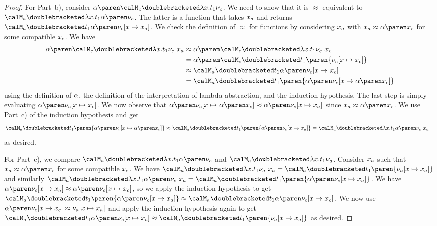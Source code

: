 \documentclass[../../diss.tex]{subfiles}
\begin{document}
\begin{proof}
    For Part~b), consider $\abs{\semc{\lambda x . t_1}{\valc}}$.
    We need to show that it is $\approx$-equivalent to $\sema{\lambda x . t_1}{\abs{\valc}}$.
    The latter is a function that takes $x_a$ and returns $\sema{t_1}{\abs{\valc}[x \mapsto \xa]}$.
    We check the definition of $\approx$ for functions by considering $x_a$ with $\xa \approx \abs{\xc}$ for some compatible $x_c$.
    We have
    \begin{align*}
        \abs{\semc{\lambda x . t_1}{\valc}} \appl \xa
        &\approx \abs{\semc{\lambda x . t_1}{\valc} \appl \xc}
        \\
        &= \abs{\semc{t_1}{\paren{\valc [x \mapsto \xc]}}}
        \\
        &\approx \sema{t_1}{\abs{\valc [x \mapsto \xc]}}
        \\
        &= \sema{t_1}{\paren{\abs{\valc} [x \mapsto \abs{\xc}]}}
    \end{align*}
    using the definition of $\abs$, the definition of the interpretation of lambda abstraction, and the induction hypothesis.
    The last step is simply evaluating $\abs{\valc [x \mapsto \xc]}$.
    We now observe that $\abs{\valc}[x \mapsto \abs{\xc}] \approx \abs{\valc}[x \mapsto \xa]$ since $\xa \approx \abs{\xc}$.
    We use Part~c) of the induction hypothesis and get
    \begin{align*}
       \sema{t_1}{\paren{\abs{\valc} [x \mapsto \abs{\xc}]}}
       &\approx  \sema{t_1}{\paren{\abs{\valc} [x \mapsto \xa]}}
       = \sema{\lambda x. t_1}{\abs{\valc}} \appl \xa
    \end{align*}
    as desired.

    For Part~c), we compare $\sema{\lambda x . t_1}{\abs{\valc}}$ and $\sema{\lambda x . t_1}{\vala}$.
    Consider $x_a$ such that $\xa \approx \abs{\xc}$ for some compatible $x_c$.
    We have $\sema{\lambda x .  t_1}{\vala} \appl \xa = \sema{t_1}{\paren{\vala[x \mapsto \xa]}}$
    and similarly $\sema{\lambda x .  t_1}{\abs{\valc}} \appl \xa = \sema{t_1}{\paren{\abs{\valc}[x \mapsto \xa]}}$.
    We have $\abs{\valc}[x \mapsto \xa] \approx \abs{\valc[x \mapsto \xc]}$, so we apply the induction hypothesis to get
    $\sema{t_1}{\paren{\abs{\valc}[x \mapsto \xa]}} \approx \sema{t_1}{\abs{\valc[x \mapsto \xc]}}$.
    We now use $\abs{\valc[x \mapsto \xc]} \approx \vala[x \mapsto \xa]$ and apply the induction hypothesis again to get
    $\sema{t_1}{\abs{\valc[x \mapsto \xc]}} \approx \sema{t_1}{\paren{\vala[x \mapsto \xa]}}$ as desired.

    \cheatpagebreak


\end{proof}
\end{document}
